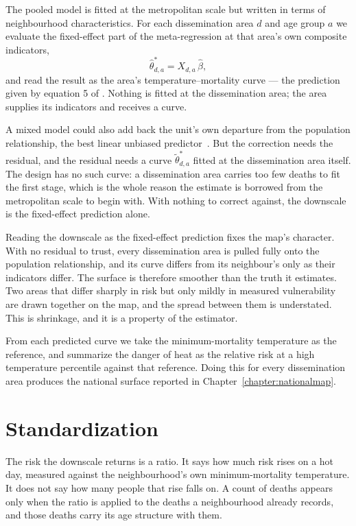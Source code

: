 The pooled model is fitted at the metropolitan scale but written in terms of neighbourhood characteristics. For each dissemination area $d$ and age group $a$ we evaluate the fixed-effect part of the meta-regression at that area's own composite indicators,
\begin{equation}
  \hat{\theta}^{*}_{d,a} = X_{d,a}\,\hat{\beta},
\end{equation}
and read the result as the area's temperature--mortality curve --- the prediction given by equation 5 of \citet{sera2019}. Nothing is fitted at the dissemination area; the area supplies its indicators and receives a curve.

A mixed model could also add back the unit's own departure from the population relationship, the best linear unbiased predictor~\citep{sera2019mixmeta}. But the correction needs the residual, and the residual needs a curve $\tilde{\theta}^{*}_{d,a}$ fitted at the dissemination area itself. The design has no such curve: a dissemination area carries too few deaths to fit the first stage, which is the whole reason the estimate is borrowed from the metropolitan scale to begin with. With nothing to correct against, the downscale is the fixed-effect prediction alone.

Reading the downscale as the fixed-effect prediction fixes the map's character. With no residual to trust, every dissemination area is pulled fully onto the population relationship, and its curve differs from its neighbour's only as their indicators differ. The surface is therefore smoother than the truth it estimates. Two areas that differ sharply in risk but only mildly in measured vulnerability are drawn together on the map, and the spread between them is understated. This is shrinkage, and it is a property of the estimator.

From each predicted curve we take the minimum-mortality temperature as the reference, and summarize the danger of heat as the relative risk at a high temperature percentile against that reference. Doing this for every dissemination area produces the national surface reported in Chapter~\ref{chapter:nationalmap}.

\section{Standardization}\label{sec:standardization}

The risk the downscale returns is a ratio. It says how much risk rises on a
hot day, measured against the neighbourhood's own minimum-mortality
temperature. It does not say how many people that rise falls on. A count of
deaths appears only when the ratio is applied to the deaths a neighbourhood
already records, and those deaths carry its age structure with them.

